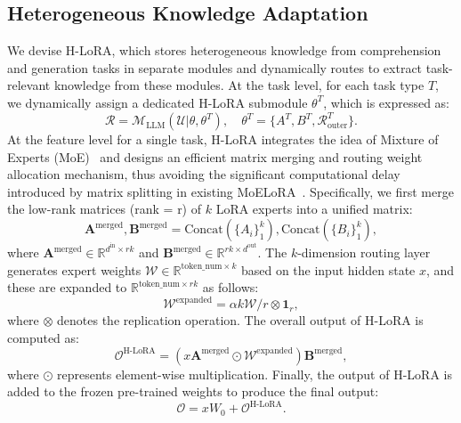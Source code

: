 \subsection{Heterogeneous Knowledge Adaptation}
We devise H-LoRA, which stores heterogeneous knowledge from comprehension and generation tasks in separate modules and dynamically routes to extract task-relevant knowledge from these modules. 
At the task level, for each task type $ T $, we dynamically assign a dedicated H-LoRA submodule $ \theta^T $, which is expressed as:
\begin{equation}
    \mathcal{R} = \mathcal{M}_\text{LLM}(\mathcal{U}|\theta, \theta^T), \quad \theta^T = \{A^T, B^T, \mathcal{R}^T_\text{outer}\}.
\end{equation}
At the feature level for a single task, H-LoRA integrates the idea of Mixture of Experts (MoE)~\cite{masoudnia2014mixture} and designs an efficient matrix merging and routing weight allocation mechanism, thus avoiding the significant computational delay introduced by matrix splitting in existing MoELoRA~\cite{luo2024moelora}. Specifically, we first merge the low-rank matrices (rank = r) of $ k $ LoRA experts into a unified matrix:
\begin{equation}
    \mathbf{A}^{\text{merged}}, \mathbf{B}^{\text{merged}} = \text{Concat}(\{A_i\}_1^k), \text{Concat}(\{B_i\}_1^k),
\end{equation}
where $ \mathbf{A}^{\text{merged}} \in \mathbb{R}^{d^\text{in} \times rk} $ and $ \mathbf{B}^{\text{merged}} \in \mathbb{R}^{rk \times d^\text{out}} $. The $k$-dimension routing layer generates expert weights $ \mathcal{W} \in \mathbb{R}^{\text{token\_num} \times k} $ based on the input hidden state $ x $, and these are expanded to $ \mathbb{R}^{\text{token\_num} \times rk} $ as follows:
\begin{equation}
    \mathcal{W}^\text{expanded} = \alpha k \mathcal{W} / r \otimes \mathbf{1}_r,
\end{equation}
where $ \otimes $ denotes the replication operation.
The overall output of H-LoRA is computed as:
\begin{equation}
    \mathcal{O}^\text{H-LoRA} = (x \mathbf{A}^{\text{merged}} \odot \mathcal{W}^\text{expanded}) \mathbf{B}^{\text{merged}},
\end{equation}
where $ \odot $ represents element-wise multiplication. Finally, the output of H-LoRA is added to the frozen pre-trained weights to produce the final output:
\begin{equation}
    \mathcal{O} = x W_0 + \mathcal{O}^\text{H-LoRA}.
\end{equation}

